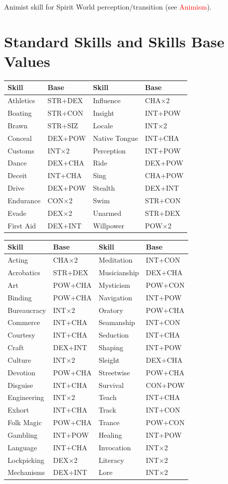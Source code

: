 \documentclass[10pt]{article}
\begin{document}
Animist skill for Spirit World perception/transition (see \textcolor{red}{Animism}).


\section{Standard Skills and Skills Base Values}
\label{sec:skill_table}

\begin{longtable}{|l|l|l|l|}
\hline
\textbf{Skill} & \textbf{Base} & \textbf{Skill} & \textbf{Base} \\
\hline
Athletics & STR+DEX & Influence & CHA×2 \\
Boating & STR+CON & Insight & INT+POW \\
Brawn & STR+SIZ & Locale & INT×2 \\
Conceal & DEX+POW & Native Tongue & INT+CHA \\
Customs & INT×2 & Perception & INT+POW \\
Dance & DEX+CHA & Ride & DEX+POW \\
Deceit & INT+CHA & Sing & CHA+POW \\
Drive & DEX+POW & Stealth & DEX+INT \\
Endurance & CON×2 & Swim & STR+CON \\
Evade & DEX×2 & Unarmed & STR+DEX \\
First Aid & DEX+INT & Willpower & POW×2 \\
\hline
\end{longtable}

\begin{longtable}{|l|l|l|l|}
\hline
\textbf{Skill} & \textbf{Base} & \textbf{Skill} & \textbf{Base} \\
\hline
Acting & CHA×2 & Meditation & INT+CON \\
Acrobatics & STR+DEX & Musicianship & DEX+CHA \\
Art & POW+CHA & Mysticism & POW+CON \\
Binding & POW+CHA & Navigation & INT+POW \\
Bureaucracy & INT×2 & Oratory & POW+CHA \\
Commerce & INT+CHA & Seamanship & INT+CON \\
Courtesy & INT+CHA & Seduction & INT+CHA \\
Craft & DEX+INT & Shaping & INT+POW \\
Culture & INT×2 & Sleight & DEX+CHA \\
Devotion & POW+CHA & Streetwise & POW+CHA \\
Disguise & INT+CHA & Survival & CON+POW \\
Engineering & INT×2 & Teach & INT+CHA \\
Exhort & INT+CHA & Track & INT+CON \\
Folk Magic & POW+CHA & Trance & POW+CON \\
Gambling & INT+POW & Healing & INT+POW \\
Language & INT+CHA & Invocation & INT×2 \\
Lockpicking & DEX×2 & Literacy & INT×2 \\
Mechanisms & DEX+INT & Lore & INT×2 \\
\hline
\end{longtable}
\end{document}
